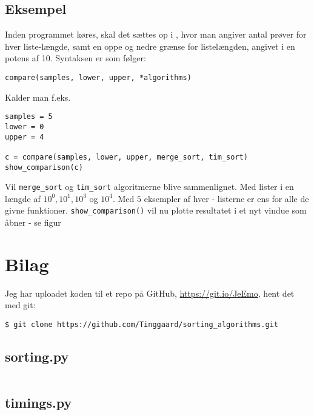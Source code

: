 \documentclass[12pt]{article}
\begin{document}
        \subsection{Eksempel}
        Inden programmet køres, skal det sættes op i , hvor man angiver antal prøver for hver liste-længde, samt en oppe og nedre grænse for listelængden, angivet i en potens af 10. Syntaksen er som følger:
        \newline
        \begin{verbatim}
compare(samples, lower, upper, *algorithms)
        \end{verbatim}
        Kalder man f.eks.
        \begin{verbatim}
samples = 5
lower = 0
upper = 4

c = compare(samples, lower, upper, merge_sort, tim_sort)
show_comparison(c)
        \end{verbatim}
        Vil \texttt{merge\_sort} og \texttt{tim\_sort} algoritmerne blive sammenlignet. Med lister i en længde af $10^0, 10^1, 10^3$ og $10^4$. Med $5$ eksempler af hver - listerne er ens for alle de givne funktioner.
        \texttt{show\_comparison()} vil nu plotte resultatet i et nyt vindue som åbner - se figur 






    \section{Bilag}
    Jeg har uploadet koden til et repo på GitHub, \url{https://git.io/JeEmo}, hent det med git:
    \begin{verbatim}
$ git clone https://github.com/Tinggaard/sorting_algorithms.git
    \end{verbatim}


        \subsection{sorting.py}
        \label{file:sorting}
        \inputminted[python3, linenos, breaklines, frame=lines, fontsize=\footnotesize]{python}{sorting.py}

    \newpage

        \subsection{timings.py}
        \label{file:timing}
        \inputminted[python3, linenos, breaklines, frame=lines, fontsize=\footnotesize]{python}{timings.py}
\end{document}
